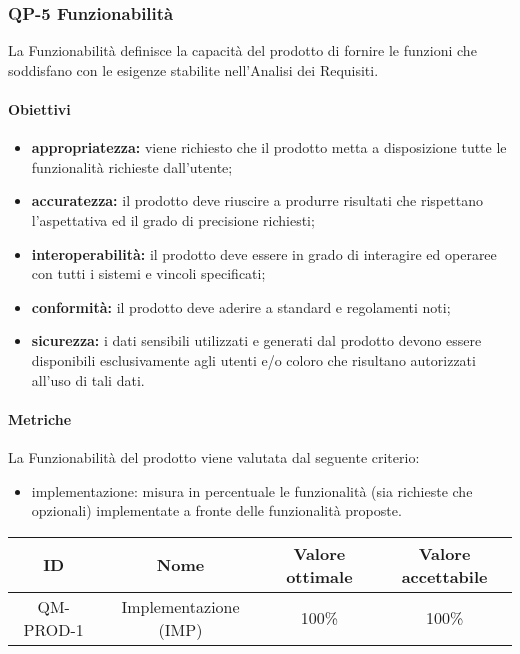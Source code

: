 \subsubsection{QP-5 Funzionabilità}
	La Funzionabilità definisce la capacità del prodotto di fornire le funzioni che soddisfano con le esigenze stabilite nell'Analisi dei Requisiti.
	\paragraph{Obiettivi}
		\begin{itemize}
			\item \textbf{appropriatezza:} viene richiesto che il prodotto metta a disposizione tutte le funzionalità richieste dall'utente;
			\item \textbf{accuratezza:} il prodotto deve riuscire a produrre risultati che rispettano l'aspettativa ed il grado di precisione richiesti;
			\item \textbf{interoperabilità:} il prodotto deve essere in grado di interagire ed operaree con tutti i sistemi e vincoli specificati;
			\item \textbf{conformità:} il prodotto deve aderire a standard e regolamenti noti;
			\item \textbf{sicurezza:} i dati sensibili utilizzati e generati dal prodotto devono essere disponibili esclusivamente agli utenti e/o coloro che risultano autorizzati all'uso di tali dati.
		\end{itemize}
	\paragraph{Metriche}
	La Funzionabilità del prodotto viene valutata dal seguente criterio:
	\begin{itemize}
		\item implementazione: misura in percentuale le funzionalità (sia richieste che opzionali) implementate a fronte delle funzionalità proposte.
	\end{itemize}
	\begin{center}
		\begin{tabular}{|c|c|c|c|}
			\hline
			ID & Nome & Valore ottimale & Valore accettabile \\
			\hline
			QM-PROD-1 & Implementazione (IMP)  & 100\% & 100\% \\
			\hline
		\end{tabular}
	\end{center}
